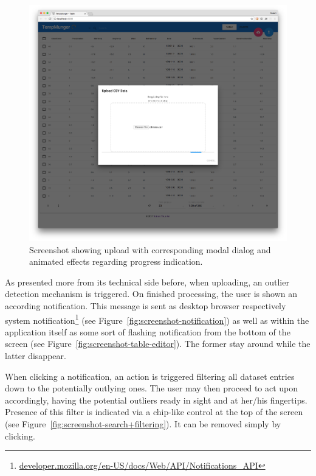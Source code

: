 \begin{figure}[h]
  \centering
  \includegraphics[width=1.0\textwidth]{figures/implementation/screenshot-upload}
  \caption{Screenshot showing upload with corresponding modal dialog and animated effects regarding progress indication.}
  \label{fig:screenshot-upload}
\end{figure}

As presented more from its technical side before, when uploading, an outlier detection mechanism is triggered.
On finished processing, the user is shown an according notification.
This message is sent as desktop browser respectively system notification\footnote{\textcolor{blue}{\href{https://developer.mozilla.org/en-US/docs/Web/API/Notifications_API}{developer.mozilla.org/en-US/docs/Web/API/Notifications\_API}}} (see Figure~\ref{fig:screenshot-notification}) as well as within the application itself as some sort of flashing notification from the bottom of the screen (see Figure~\ref{fig:screenshot-table-editor}).
The former stay around while the latter disappear.

When clicking a notification, an action is triggered filtering all dataset entries down to the potentially outlying ones.
The user may then proceed to act upon accordingly, having the potential outliers ready in sight and at her/his fingertips.
Presence of this filter is indicated via a chip-like control at the top of the screen (see Figure~\ref{fig:screenshot-search+filtering}).
It can be removed simply by clicking.

